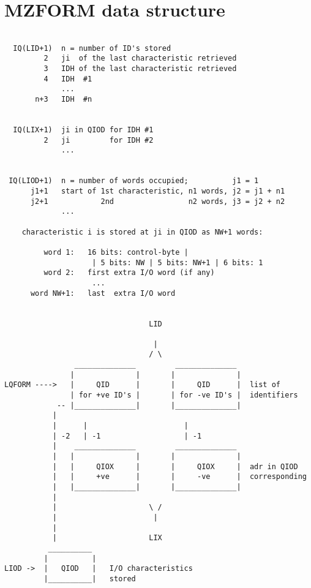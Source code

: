 \section{MZFORM data structure}

\begin{verbatim}

  IQ(LID+1)  n = number of ID's stored
         2   ji  of the last characteristic retrieved
         3   IDH of the last characteristic retrieved
         4   IDH  #1
             ...
       n+3   IDH  #n


  IQ(LIX+1)  ji in QIOD for IDH #1
         2   ji         for IDH #2
             ...


 IQ(LIOD+1)  n = number of words occupied;          j1 = 1
      j1+1   start of 1st characteristic, n1 words, j2 = j1 + n1
      j2+1            2nd                 n2 words, j3 = j2 + n2
             ...

    characteristic i is stored at ji in QIOD as NW+1 words:

         word 1:   16 bits: control-byte |
                    | 5 bits: NW | 5 bits: NW+1 | 6 bits: 1
         word 2:   first extra I/O word (if any)
                    ...
      word NW+1:   last  extra I/O word


                                 LID

                                  |
                                 / \
                ______________         ______________
               |              |       |              |
LQFORM ---->   |     QID      |       |     QID      |  list of
               | for +ve ID's |       | for -ve ID's |  identifiers
            -- |______________|       |______________|
           |
           |      |                      |
           | -2   | -1                   | -1
           |    ______________         ______________
           |   |              |       |              |
           |   |     QIOX     |       |     QIOX     |  adr in QIOD
           |   |     +ve      |       |     -ve      |  corresponding
           |   |______________|       |______________|
           |
           |                     \ /
           |                      |
           |
           |                     LIX
          __________
         |          |
LIOD ->  |   QIOD   |   I/O characteristics
         |__________|   stored
\end{verbatim} 

